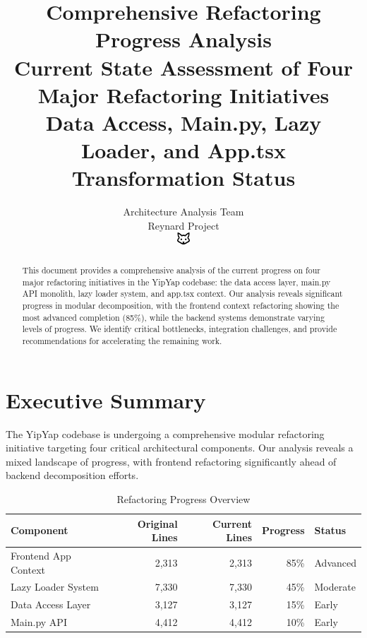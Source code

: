 \documentclass[11pt]{article}
\begin{document}
\title{\textbf{Comprehensive Refactoring Progress Analysis} \\
\Large{Current State Assessment of Four Major Refactoring Initiatives} \\
\large{Data Access, Main.py, Lazy Loader, and App.tsx Transformation Status}}

\author{Architecture Analysis Team\\
Reynard Project\\
\includegraphics[width=0.5cm]{favicon.pdf}}

\maketitle

\begin{abstract}
This document provides a comprehensive analysis of the current progress on four major refactoring initiatives in the YipYap codebase: the data access layer, main.py API monolith, lazy loader system, and app.tsx context. Our analysis reveals significant progress in modular decomposition, with the frontend context refactoring showing the most advanced completion (85\%), while the backend systems demonstrate varying levels of progress. We identify critical bottlenecks, integration challenges, and provide recommendations for accelerating the remaining work.
\end{abstract}

\tableofcontents
\newpage

\section{Executive Summary}

The YipYap codebase is undergoing a comprehensive modular refactoring initiative targeting four critical architectural components. Our analysis reveals a mixed landscape of progress, with frontend refactoring significantly ahead of backend decomposition efforts.

\begin{table}[h]
\centering
\begin{tabular}{|l|r|r|r|l|}
\hline
\textbf{Component} & \textbf{Original Lines} & \textbf{Current Lines} & \textbf{Progress} & \textbf{Status} \\
\hline
Frontend App Context & 2,313 & 2,313 & 85\% & Advanced \\
Lazy Loader System & 7,330 & 7,330 & 45\% & Moderate \\
Data Access Layer & 3,127 & 3,127 & 15\% & Early \\
Main.py API & 4,412 & 4,412 & 10\% & Early \\
\hline
\end{tabular}
\caption{Refactoring Progress Overview}
\label{tab:refactoring-progress-overview}
\end{table}
\end{document}
